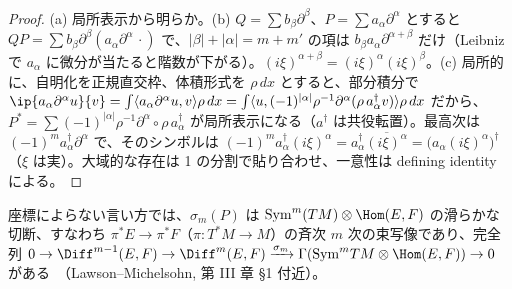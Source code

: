 \begin{proof}
(a) 局所表示から明らか。(b) $Q=\sum b_\beta\partial^\beta$、$P=\sum a_\alpha\partial^\alpha$ とすると $QP=\sum b_\beta\partial^\beta(a_\alpha\partial^\alpha\,\cdot)$ で、$|\beta|+|\alpha|=m+m'$ の項は $b_\beta a_\alpha\partial^{\alpha+\beta}$ だけ（Leibniz で $a_\alpha$ に微分が当たると階数が下がる）。$(i\xi)^{\alpha+\beta}=(i\xi)^\alpha(i\xi)^\beta$。(c) 局所的に、自明化を正規直交枠、体積形式を $\rho\,dx$ とすると、部分積分で $\ip{a_\alpha\partial^\alpha u}{v}=\int\langle a_\alpha\partial^\alpha u,v\rangle\rho\,dx=\int\langle u,(-1)^{|\alpha|}\rho^{-1}\partial^\alpha(\rho\,a_\alpha^\dagger v)\rangle\rho\,dx$ だから、$P^*=\sum(-1)^{|\alpha|}\rho^{-1}\partial^\alpha\circ\rho\,a_\alpha^\dagger$ が局所表示になる（$a^\dagger$ は共役転置）。最高次は $(-1)^m a_\alpha^\dagger\partial^\alpha$ で、そのシンボルは $(-1)^m a_\alpha^\dagger(i\xi)^\alpha=a_\alpha^\dagger\overline{(i\xi)^\alpha}=\bigl(a_\alpha(i\xi)^\alpha\bigr)^\dagger$（$\xi$ は実）。大域的な存在は 1 の分割で貼り合わせ、一意性は defining identity による。
\end{proof}
\begin{rem}
座標によらない言い方では、$\sigma_m(P)$ は $\mathrm{Sym}^m(TM)\otimes\Hom(E,F)$ の滑らかな切断、すなわち $\pi^*E\to\pi^*F$（$\pi:T^*M\to M$）の斉次 $m$ 次の束写像であり、完全列 $0\to\Diff^{m-1}(E,F)\to\Diff^m(E,F)\xrightarrow{\sigma_m}\Gamma(\mathrm{Sym}^mTM\otimes\Hom(E,F))\to0$ がある\tC\ （Lawson--Michelsohn, 第 III 章 \S1 付近）。
\end{rem}

